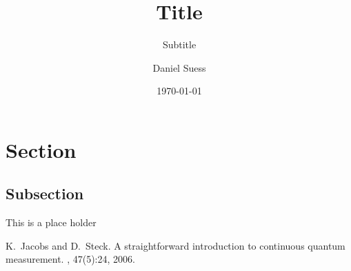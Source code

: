 \documentclass[xcolor=x11names]{beamer}
\title{Title}
\subtitle{Subtitle}
\author{Daniel Suess}
\date{\today}
\begin{document}
\begin{frame}
\titlepage
\end{frame}


\begin{frame}
\tableofcontents
\end{frame}

\section{Section}
\subsection{Subsection}

\begin{frame}
  \begin{block}
    This is a place holder
  \end{block}
\end{frame}


\begin{frame}
\begin{thebibliography}{9}
\bibitem[JS06]{}
K.~Jacobs and D.~Steck.
\newblock A straightforward introduction to continuous quantum measurement.
, 47(5):24, 2006.
\end{thebibliography}
\end{frame}

{ %
\frame[plain]{}
} 
\end{document}
